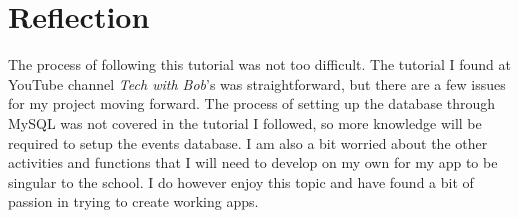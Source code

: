\documentclass[10pt,twocolumn]{article}
\begin{document}
\section{Reflection}
The process of following this tutorial was not too difficult. The tutorial I found at YouTube channel \textit{Tech with Bob}'s was straightforward, but there are a few issues for my project moving forward. The process of setting up the database through MySQL was not covered in the tutorial I followed, so more knowledge will be required to setup the events database. I am also a bit worried about the other activities and functions that I will need to develop on my own for my app to be singular to the school. I do however enjoy this topic and have found a bit of passion in trying to create working apps.

\printbibliography
\end{document}
